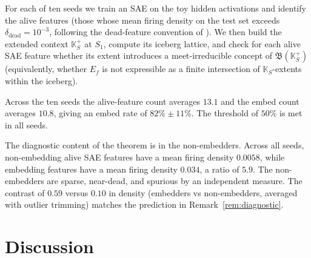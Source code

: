 \documentclass[a4paper,fleqn]{cas-dc}
\newcommand{\K}{\mathbb{K}}
\newcommand{\Lat}{\mathfrak{B}}
\begin{document}
For each of ten seeds we train an SAE on the toy hidden activations and identify the alive features (those whose mean firing density on the test set exceeds $\delta_{\mathrm{dead}} = 10^{-3}$, following the dead-feature convention of \citet{bricken2023monosemanticity}).
We then build the extended context $\K_S^+$ at $S_1$, compute its iceberg lattice, and check for each alive SAE feature whether its extent introduces a meet-irreducible concept of $\Lat(\K_S^+)$ (equivalently, whether $E_f$ is not expressible as a finite intersection of $\K_S$-extents within the iceberg).

Across the ten seeds the alive-feature count averages $13.1$ and the embed count averages $10.8$, giving an embed rate of $82\% \pm 11\%$.
The threshold of $50\%$ is met in all seeds.

The diagnostic content of the theorem is in the non-embedders.
Across all seeds, non-embedding alive SAE features have a mean firing density $0.0058$, while embedding features have a mean firing density $0.034$, a ratio of $5.9$.
The non-embedders are sparse, near-dead, and spurious by an independent measure.
The contrast of $0.59$ versus $0.10$ in density (embedders vs non-embedders, averaged with outlier trimming) matches the prediction in Remark~\ref{rem:diagnostic}.

\section{Discussion}\label{sec:discussion}
\end{document}
